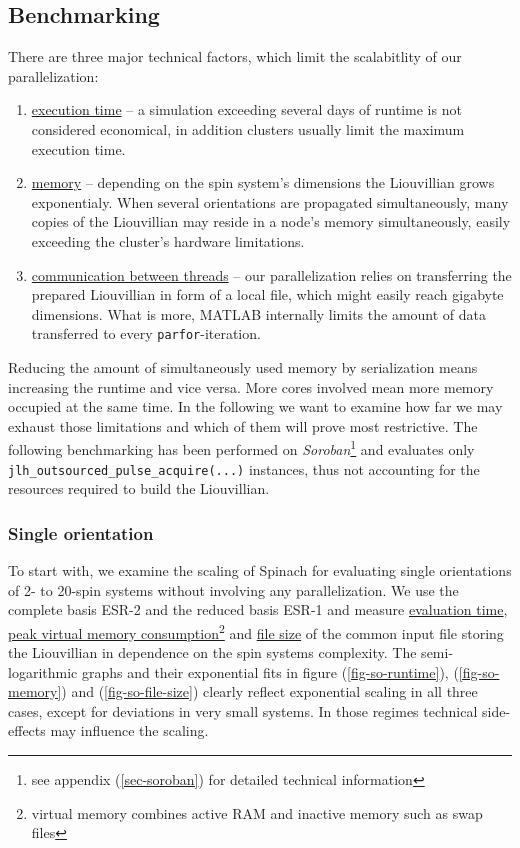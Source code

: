 \documentclass[11.5pt,a4paper]{article}
\begin{document}
\subsection{Benchmarking}
There are three  major technical factors, which limit the scalabitlity of our parallelization:
\begin{enumerate}
 \item \underline{execution time} -- a simulation exceeding several days of runtime is not considered economical, in addition clusters usually limit the maximum execution time.
 \item \underline{memory} -- depending on the spin system's dimensions the Liouvillian grows exponentialy. When several orientations are propagated simultaneously, many copies of the Liouvillian may reside in a node's memory simultaneously, easily exceeding the cluster's hardware limitations.
  \item \underline{communication between threads} -- our parallelization relies on transferring the prepared Liouvillian in form of a local file, which might easily reach gigabyte dimensions. What is more, MATLAB internally limits the amount of data transferred to every \verb$parfor$-iteration. 
\end{enumerate}
Reducing the amount of simultaneously used memory by serialization means increasing the runtime and vice versa. More cores involved mean more memory occupied at the same time. In the following we want to examine how far we may exhaust those limitations and which of them will prove most restrictive. The following benchmarking has been performed on \emph{Soroban}\footnote{see appendix (\ref{sec-soroban}) for detailed technical information} and evaluates only \verb$jlh_outsourced_pulse_acquire(...)$ instances, thus not accounting for the resources required to build the Liouvillian.
 
\subsubsection{Single orientation}
To start with, we examine the scaling of Spinach for evaluating single orientations of 2- to 20-spin systems without involving any parallelization. We use the complete basis ESR-2 and the reduced basis ESR-1 and measure \underline{evaluation time}, \underline{peak virtual memory consumption}\footnote{virtual memory combines active RAM and inactive memory such as swap files} and \underline{file size} of the common input file storing the Liouvillian in dependence on the spin systems complexity. The semi-logarithmic graphs and their exponential fits in figure (\ref{fig-so-runtime}), (\ref{fig-so-memory}) and (\ref{fig-so-file-size}) clearly reflect exponential scaling in all three cases, except for deviations in very small systems. In those regimes technical side-effects may influence the scaling.
\end{document}
